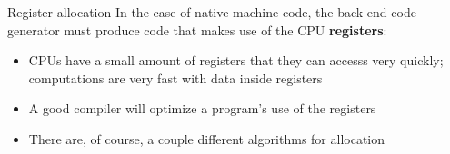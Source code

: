 \documentclass[../index.tex]{subfiles}
\begin{document}
\renewcommand{\currenttitle}{Register allocation}
\begin{frame}[fragile]{\currenttitle}
  In the case of native machine code, the back-end code generator must produce
  code that makes use of the CPU \textbf{registers}:

  \only<+->{}
  \begin{itemize}
    \item<+-> CPUs have a small amount of registers that they can accesss very
      quickly; computations are very fast with data inside registers
    \item<+-> A good compiler will optimize a program's use of the registers
    \item<+-> There are, of course, a couple different algorithms for allocation
  \end{itemize}
\end{frame}

\end{document}
